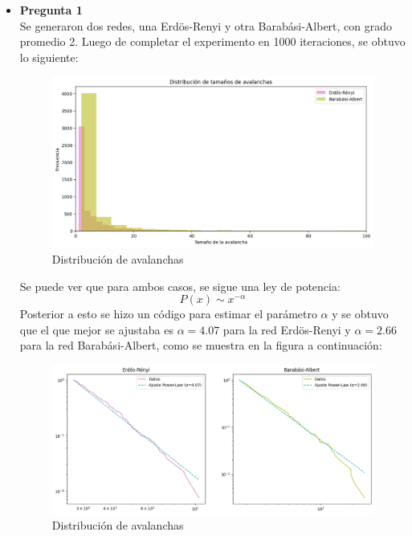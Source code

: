 \documentclass[10pt]{article}
\begin{document}
\begin{itemize}
    \item \textbf{Pregunta 1}\\
        Se generaron dos redes, una Erdös-Renyi y otra Barabási-Albert, con grado promedio 2. Luego de completar el experimento en 1000 iteraciones, se obtuvo lo siguiente:
        \begin{figure}[H]
            \centering
            \includegraphics[scale=0.55]{images/avalancha.png}
            \caption{Distribución de avalanchas}
            \label{fig:grafico_avalancha}
        \end{figure}
        Se puede ver que para ambos casos, se sigue una ley de potencia: $$P(x) \sim x^{-\alpha}$$Posterior a esto se hizo un código para estimar el parámetro $\alpha$ y se obtuvo que el que mejor se ajustaba es $\alpha = 4.07$ para la red Erdös-Renyi y $\alpha = 2.66$ para la red Barabási-Albert, como se muestra en la figura a continuación:
        \begin{figure}[H]
            \centering
            \includegraphics[scale=0.55]{images/grafico_ajuste.png}
            \caption{Distribución de avalanchas}
            \label{fig:grafico_distribucion}
        \end{figure}
        \newpage

\end{itemize}
\end{document}
